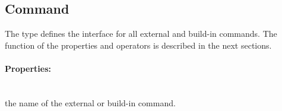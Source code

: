 \subsection{Command} 

%

The  type defines the interface for all external and
build-in commands. The function of the properties and operators is described
in the next sections.

\paragraph{Properties:}

\begin{asparadesc}
%
\item[\code{name}] \hfill \\
the name of the external or build-in command.
%
\end{asparadesc}


